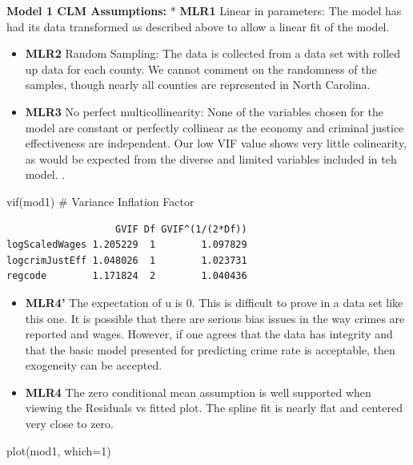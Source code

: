 \documentclass[]{article}
\newenvironment{Shaded}{}{}
\newcommand{\CommentTok}[1]{\textcolor[rgb]{0.00,0.50,0.00}{#1}}
\newcommand{\DataTypeTok}[1]{#1}
\newcommand{\DecValTok}[1]{#1}
\newcommand{\KeywordTok}[1]{\textcolor[rgb]{0.00,0.00,1.00}{#1}}
\newcommand{\NormalTok}[1]{#1}
\begin{document}
\textbf{Model 1 CLM Assumptions:} * \textbf{MLR1} Linear in parameters:
The model has had its data transformed as described above to allow a
linear fit of the model.

\begin{itemize}
\item
  \textbf{MLR2} Random Sampling: The data is collected from a data set
  with rolled up data for each county. We cannot comment on the
  randomness of the samples, though nearly all counties are represented
  in North Carolina.
\item
  \textbf{MLR3} No perfect multicollinearity: None of the variables
  chosen for the model are constant or perfectly collinear as the
  economy and criminal justice effectiveness are independent. Our low
  VIF value shows very little colinearity, as would be expected from the
  diverse and limited variables included in teh model. .
\end{itemize}

\begin{Shaded}
\begin{Highlighting}[]
\KeywordTok{vif}\NormalTok{(mod1) }\CommentTok{# Variance Inflation Factor}
\end{Highlighting}
\end{Shaded}

\begin{verbatim}
                   GVIF Df GVIF^(1/(2*Df))
logScaledWages 1.205229  1        1.097829
logcrimJustEff 1.048026  1        1.023731
regcode        1.171824  2        1.040436
\end{verbatim}

\begin{itemize}
\item
  \textbf{MLR4'} The expectation of u is 0. This is difficult to prove
  in a data set like this one. It is possible that there are serious
  bias issues in the way crimes are reported and wages. However, if one
  agrees that the data has integrity and that the basic model presented
  for predicting crime rate is acceptable, then exogeneity can be
  accepted.
\item
  \textbf{MLR4} The zero conditional mean assumption is well supported
  when viewing the Residuals vs fitted plot. The spline fit is nearly
  flat and centered very close to zero.
\end{itemize}

\begin{Shaded}
\begin{Highlighting}[]
\KeywordTok{plot}\NormalTok{(mod1, }\DataTypeTok{which=}\DecValTok{1}\NormalTok{)}
\end{Highlighting}
\end{Shaded}
\end{document}
